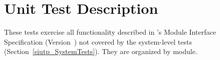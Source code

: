 \section{Unit Test Description}
These tests exercise all functionality described in \progname{}'s Module
Interface Specification (Version~\misversion) not covered by the system-level
tests (Section~\ref{siutp_SystemTests}). They are organized by module.



\clearpage

